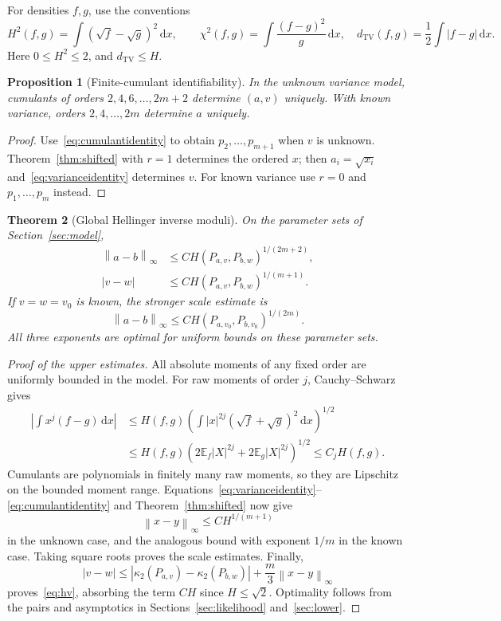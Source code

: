 \documentclass[11pt,a4paper]{article}
\numberwithin{equation}{section}
\newtheorem{theorem}{Theorem}[section]
\newtheorem{proposition}[theorem]{Proposition}
\theoremstyle{definition}
\theoremstyle{remark}
\newcommand{\E}{\mathbb E}
\newcommand{\TV}{d_{\mathrm{TV}}}
\newcommand{\dd}{\,\mathrm d}
\newcommand{\norm}[1]{\left\lVert#1\right\rVert}
\newcommand{\abs}[1]{\left|#1\right|}
\newcommand{\kap}{\kappa}
\begin{document}
For densities $f,g$, use the conventions
\begin{equation}
 H^2(f,g)=\int(\sqrt f-\sqrt g)^2\dd x,\qquad
 \chi^2(f,g)=\int\frac{(f-g)^2}{g}\dd x,
 \quad \TV(f,g)=\frac12\int|f-g|\dd x.
 \label{eq:metrics}
\end{equation}
Here $0\le H^2\le2$, and $\TV\le H$.

\begin{proposition}[Finite-cumulant identifiability]
\label{prop:identifiable}
In the unknown variance model, cumulants of orders
$2,4,6,\ldots,2m+2$ determine $(a,v)$ uniquely. With known variance, orders
$2,4,\ldots,2m$ determine $a$ uniquely.
\end{proposition}
\begin{proof}
Use~\eqref{eq:cumulantidentity} to obtain $p_2,\ldots,p_{m+1}$ when $v$ is
unknown. Theorem~\ref{thm:shifted} with $r=1$ determines the ordered $x$;
then $a_i=\sqrt{x_i}$ and~\eqref{eq:varianceidentity} determines $v$.
For known variance use $r=0$ and $p_1,\ldots,p_m$ instead.
\end{proof}

\begin{theorem}[Global Hellinger inverse moduli]
\label{thm:hellinger}
On the parameter sets of Section~\ref{sec:model},
\begin{align}
 \norm{a-b}_\infty&\le C H(P_{a,v},P_{b,w})^{1/(2m+2)},
 \label{eq:ha}\\
 |v-w|&\le C H(P_{a,v},P_{b,w})^{1/(m+1)}.
 \label{eq:hv}
\end{align}
If $v=w=v_0$ is known, the stronger scale estimate is
\begin{equation}
 \norm{a-b}_\infty\le C H(P_{a,v_0},P_{b,v_0})^{1/(2m)}.
 \label{eq:hknown}
\end{equation}
All three exponents are optimal for uniform bounds on these parameter sets.
\end{theorem}
\begin{proof}[Proof of the upper estimates]
All absolute moments of any fixed order are uniformly bounded in the model.
For raw moments of order $j$, Cauchy--Schwarz gives
\begin{align}
 \abs{\int x^j(f-g)\dd x}
 &\le H(f,g)\left(\int |x|^{2j}(\sqrt f+\sqrt g)^2\dd x\right)^{1/2}\\
 &\le H(f,g)\left(2\E_f|X|^{2j}+2\E_g|X|^{2j}\right)^{1/2}
 \le C_jH(f,g).
 \label{eq:momenthellinger}
\end{align}
Cumulants are polynomials in finitely many raw moments, so they are Lipschitz
on the bounded moment range. Equations~\eqref{eq:varianceidentity}--
\eqref{eq:cumulantidentity} and Theorem~\ref{thm:shifted} now give
\[
 \norm{x-y}_\infty\le C H^{1/(m+1)}
\]
in the unknown case, and the analogous bound with exponent $1/m$ in the
known case. Taking square roots proves the scale estimates. Finally,
\[
 |v-w|\le |\kap_2(P_{a,v})-\kap_2(P_{b,w})|
              +\frac m3\norm{x-y}_\infty
\]
proves~\eqref{eq:hv}, absorbing the term $CH$ since $H\le\sqrt2$.
Optimality follows from the pairs and asymptotics in Sections~\ref{sec:likelihood}
and~\ref{sec:lower}.
\end{proof}
\end{document}
